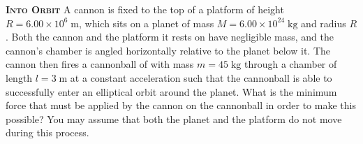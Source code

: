 \begin{problem}{\textbf{\textsc{Into Orbit}}} A cannon is fixed to the top of a platform of height $R = 6.00 \times 10^6\;\mathrm{m}$, which sits on a planet of mass $M = 6.00 \times 10^{24}\;\mathrm{kg}$ and radius $R$. Both the cannon and the platform it rests on have negligible mass, and the cannon's chamber is angled horizontally relative to the planet below it. The cannon then fires a cannonball of with mass $m = 45\;\mathrm{kg}$ through a chamber of length $l=3\;\mathrm{m}$ at a constant acceleration such that the cannonball is able to successfully enter an elliptical orbit around the planet. What is the minimum force that must be applied by the cannon on the cannonball in order to make this possible? You may assume that both the planet and the platform do not move during this process.\end{problem}